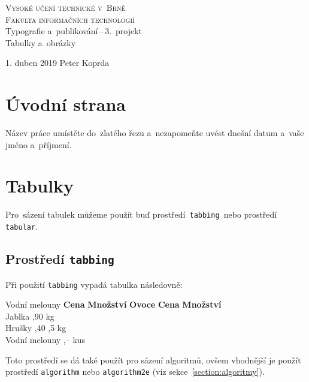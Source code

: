 \documentclass[11pt,a4paper]{article}
\begin{document}
\hypersetup{pageanchor=false}
\begin{titlepage}
    \begin{center}
    \Huge\textsc{Vysoké učení technické v~Brně}\\
    \huge\textsc{Fakulta informačních technologií}\\
    \renewcommand{\baselinestretch}{0.4}
    \LARGE{Typografie a~publikování\,--\,3.~projekt}\\
    \vspace{0.5em}
    \Huge{Tabulky a~obrázky}\\
    \renewcommand{\baselinestretch}{0.3}
    \end{center}
\Large {1. duben 2019 \hfill Peter Koprda}
\end{titlepage}
\hypersetup{pageanchor=true}

\newpage

\section{Úvodní strana}
    Název práce umístěte do~zlatého řezu a~nezapomeňte uvést dnešní datum a~vaše jméno a~příjmení.


\section{Tabulky}
    Pro~sázení tabulek můžeme použít buď prostředí\texttt{ tabbing }nebo prostředí\texttt{ tabular}.

    \subsection{Prostředí \texttt{tabbing}}
        Při použití \texttt{tabbing} vypadá tabulka následovně:

        \begin{tabbing}
		    Vodní melouny \quad	\= \textbf{Cena} \quad	\= \textbf{Množství}\kill
		    \textbf{Ovoce}		\> \textbf{Cena}		\> \textbf{Množství}\\
		    Jablka				,90				 kg\\
		    Hrušky				,40				,5 kg\\
		    Vodní melouny		,--				 kus\\
        \end{tabbing}
        Toto prostředí se dá také použít pro sázení algoritmů, ovšem vhodnější je použít prostředí \texttt{algorithm} nebo \texttt{algorithm2e} (viz sekce~\ref{section:algoritmy}).
\end{document}
